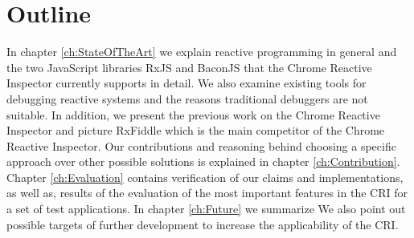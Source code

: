 \section{Outline}
In chapter \ref{ch:StateOfTheArt} we explain reactive programming in general and the two JavaScript libraries RxJS and BaconJS that the Chrome Reactive Inspector currently supports in detail. We also examine existing tools for debugging reactive systems and the reasons traditional debuggers are not suitable. In addition, we present the previous work on the Chrome Reactive Inspector and picture RxFiddle which is the main competitor of the Chrome Reactive Inspector.
Our contributions and reasoning behind choosing a specific approach over other possible solutions is explained in chapter \ref{ch:Contribution}.
Chapter \ref{ch:Evaluation} contains verification of our claims and implementations, as well as, results of the evaluation of the most important features in the CRI for a set of test applications.
In chapter \ref{ch:Future} we summarize  We also point out possible targets of further development to increase the applicability of the CRI.

